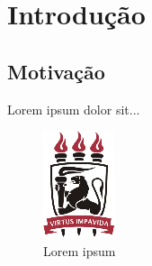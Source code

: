 \chapter{Introdução}

\section{Motivação}
\label{motivacao}

Lorem ipsum dolor sit...

\begin{figure}
    \centering
    \includegraphics{imagens/institution.png}
    \caption{Lorem ipsum}
    \label{fig:my_label}
\end{figure}